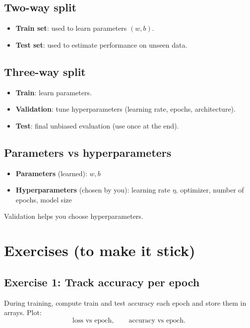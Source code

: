 \subsection{Two-way split}
\begin{itemize}[leftmargin=*]
  \item \textbf{Train set}: used to learn parameters $(w,b)$.
  \item \textbf{Test set}: used to estimate performance on unseen data.
\end{itemize}

\subsection{Three-way split}
\begin{itemize}[leftmargin=*]
  \item \textbf{Train}: learn parameters.
  \item \textbf{Validation}: tune hyperparameters (learning rate, epochs, architecture).
  \item \textbf{Test}: final unbiased evaluation (use once at the end).
\end{itemize}

\subsection{Parameters vs hyperparameters}
\begin{tcolorbox}[colframe=purple!60!black,colback=purple!3,title=\textbf{\color{purple!70!black}Important distinction}]
\begin{itemize}[leftmargin=*]
  \item \textbf{Parameters} (learned): $w, b$
  \item \textbf{Hyperparameters} (chosen by you): learning rate $\eta$, optimizer, number of epochs, model size
\end{itemize}
Validation helps you choose hyperparameters.
\end{tcolorbox}

\section{Exercises (to make it stick)}

\subsection*{\color{blue!70!black}Exercise 1: Track accuracy per epoch}
During training, compute train and test accuracy each epoch and store them in arrays. Plot:
\[
\text{loss vs epoch}, \qquad \text{accuracy vs epoch}.
\]

